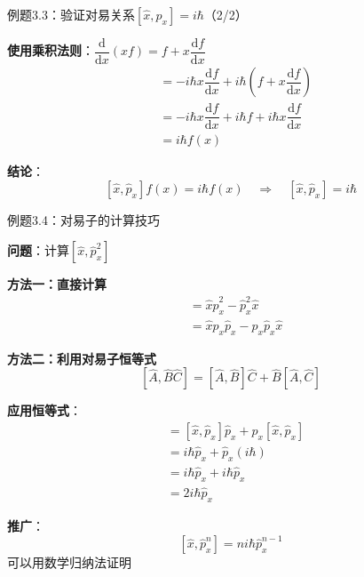 \documentclass[aspectratio=169, 10pt]{beamer}
\begin{document}
\begin{frame}{例题3.3：验证对易关系$[\hat{x}, \hat{p}_x] = i\hbar$（2/2）}

  \begin{iqbitemize}
    \item \textbf{使用乘积法则}：$\dfrac{\mathrm{d}}{\mathrm{d}x}(xf) = f + x\dfrac{\mathrm{d}f}{\mathrm{d}x}$
    \begin{align*}
      &= -i\hbar x\dfrac{\mathrm{d}f}{\mathrm{d}x} + i\hbar\left(f + x\dfrac{\mathrm{d}f}{\mathrm{d}x}\right) \\
      &= -i\hbar x\dfrac{\mathrm{d}f}{\mathrm{d}x} + i\hbar f + i\hbar x\dfrac{\mathrm{d}f}{\mathrm{d}x} \\
      &= i\hbar f(x)
    \end{align*}

    \item \textbf{结论}：
    \[
      [\hat{x}, \hat{p}_x]f(x) = i\hbar f(x) \quad \Rightarrow \quad [\hat{x}, \hat{p}_x] = i\hbar
    \]
  \end{iqbitemize}

\end{frame}

\begin{frame}{例题3.4：对易子的计算技巧}

  \textbf{问题}：计算$[\hat{x}, \hat{p}_x^2]$

  \begin{iqbitemize}
    \item \textbf{方法一：直接计算}
    \begin{align*}
      [\hat{x}, \hat{p}_x^2] &= \hat{x}\hat{p}_x^2 - \hat{p}_x^2\hat{x} \\
      &= \hat{x}\hat{p}_x\hat{p}_x - \hat{p}_x\hat{p}_x\hat{x}
    \end{align*}

    \item \textbf{方法二：利用对易子恒等式}
    \[
      [\hat{A}, \hat{B}\hat{C}] = [\hat{A}, \hat{B}]\hat{C} + \hat{B}[\hat{A}, \hat{C}]
    \]

    \item \textbf{应用恒等式}：
    \begin{align*}
      [\hat{x}, \hat{p}_x^2] &= [\hat{x}, \hat{p}_x]\hat{p}_x + \hat{p}_x[\hat{x}, \hat{p}_x] \\
      &= i\hbar\hat{p}_x + \hat{p}_x(i\hbar) \\
      &= i\hbar\hat{p}_x + i\hbar\hat{p}_x \\
      &= 2i\hbar\hat{p}_x
    \end{align*}

    \item \textbf{推广}：
    \[
      [\hat{x}, \hat{p}_x^n] = ni\hbar\hat{p}_x^{n-1}
    \]
    可以用数学归纳法证明
  \end{iqbitemize}

\end{frame}
\end{document}
